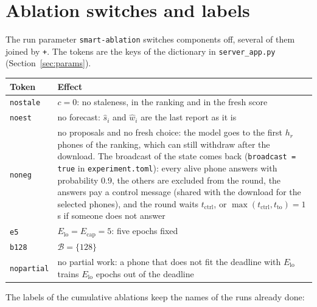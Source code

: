 \documentclass[11pt,a4paper]{article}
\newcommand{\cf}[1]{\texttt{#1}}
\begin{document}
\newpage
\section{Ablation switches and labels}
\label{sec:ablation}

The run parameter \cf{smart-ablation} switches components off, several of them
joined by \cf{+}. The tokens are the keys of the dictionary in
\cf{server\_app.py} (Section~\ref{sec:params}).

\begin{longtable}{p{}p{}}
\toprule
Token & Effect \\
\midrule
\endhead
\cf{nostale} & $c = 0$: no staleness, in the ranking and in the fresh score \\
\cf{noest} & no forecast: $\hat{s}_i$ and $\hat{w}_i$ are the last report as it is \\
\cf{noneg} & no proposals and no fresh choice: the model goes to the first $h_r$ phones of the ranking, which can still withdraw after the download. The broadcast of the state comes back (\cf{broadcast = true} in \cf{experiment.toml}): every alive phone answers with probability 0.9, the others are excluded from the round, the answers pay a control message (shared with the download for the selected phones), and the round waits $t_{\mathrm{ctrl}}$, or $\max(t_{\mathrm{ctrl}}, t_{\mathrm{to}}) = 1$ s if someone does not answer \\
\cf{e5} & $E_{\mathrm{lo}} = E_{\mathrm{cap}} = 5$: five epochs fixed \\
\cf{b128} & $\mathcal{B} = \{128\}$ \\
\cf{nopartial} & no partial work: a phone that does not fit the deadline with $E_{\mathrm{lo}}$ trains $E_{\mathrm{lo}}$ epochs out of the deadline \\
\bottomrule
\end{longtable}

The labels of the cumulative ablations keep the names of the runs already done:
\end{document}

